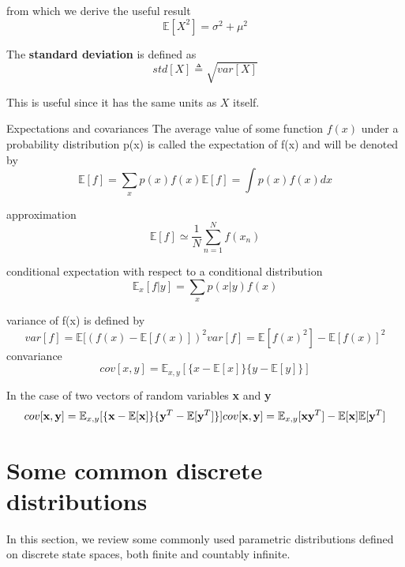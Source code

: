 from which we derive the useful result
\begin{equation}
\mathbb{E}[X^2]=\sigma^2+{\mu}^2
\end{equation}

The \textbf{standard deviation} is defined as
\begin{equation}
std[X] \triangleq \sqrt{var[X]}
\end{equation}

This is useful since it has the same units as $X$ itself.

Expectations and covariances
The average value of some function $f(x)$ under a probability distribution p(x) is called the expectation of f(x) and
will be denoted by 
\begin{equation}
                                  \mathbb{E}[f] = \sum_{x}p(x)f(x)
                                  \mathbb{E}[f] = \int p(x)f(x)dx
\end{equation}

approximation
\begin{equation}
\mathbb{E}[f] \simeq \frac{1}{N}\sum_{n=1}^{N}{f(x_n)}
\end{equation}
                                  
conditional expectation with respect to a conditional distribution                                
\begin{equation}
\mathbb{E}_x[f|y] = \sum_{x}p(x|y)f(x)
\end{equation}

variance of f(x) is defined by
\begin{equation}
var[f] = \mathbb{E}[(f(x) - \mathbb{E}[f(x)])^2
var[f] = \mathbb{E}[f(x)^2]-\mathbb{E}[f(x)]^2
\end{equation}
convariance 
\begin{equation}
cov[x,y] = \mathbb{E}_{x,y}[\{x- \mathbb{E}[x]\}\{y-\mathbb{E}[y]\}]
\end{equation}

In the case of two vectors of random variables \textbf{x} and \textbf{y}
\begin{equation}
cov[\textbf{x},\textbf{y}] = \mathbb{E}_{x,y}[\{\textbf{x}-\mathbb{E}[\textbf{x}]\} \{ \textbf{y}^T - \mathbb{E}[\textbf{y}^T ]\}] \\
cov[\textbf{x},\textbf{y}] = \mathbb{E}_{x,y}[\textbf{x}\textbf{y}^T] - \mathbb{E}[\textbf{x}] \mathbb{E}[\textbf{y}^T]
\end{equation}

\section{Some common discrete distributions}
In this section, we review some commonly used parametric distributions defined on discrete state spaces, both finite and countably infinite.


